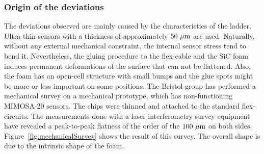       \subsubsection{Origin of the deviations}

      The deviations observed are mainly caused by the characteristics of the ladder.
      Ultra-thin sensors with a thickness of approximately $50~\rm{\mu m}$ are used.
      Naturally, without any external mechanical constraint, the internal sensor stress tend to bend it.
      Nevertheless, the gluing procedure to the flex-cable and the \gls{SiC} foam induces permanent deformations of the surface that can not be flattened.
      Also, the foam has an open-cell structure with small bumps and the glue spots might be more or less important on some positions.
      The Bristol group has performed a mechanical survey on a mechanical prototype, which has non-functioning \gls{MIMOSA}-20 sensors.
      The chips were thinned and attached to the standard flex-circuits.
      The measurements done with a laser interferometry survey equipment have revealed a peak-to-peak flatness of the order of the $100~\rm{\mu m}$ on both sides.
      Figure~\ref{fig:mechanicalSurvey} shows the result of this survey.
      The overall shape is due to the intrinsic shape of the foam.
       
